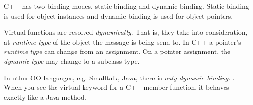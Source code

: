 



C++ has two binding modes, static-binding and dynamic binding. 
Static binding is used for object instances and dynamic binding is 
used for object pointers.

Virtual functions are resolved \textit{dynamically}. That is, they take 
into consideration, at \textit{runtime type} of the object the message is 
being send to. In C++ a pointer's \textit{runtime type} can change 
from an assignment. On a pointer assignment, the \textit{dynamic type} may change to a 
subclass type. 


In other OO languages, e.g. Smalltalk, Java, there is \textit{only dynamic binding}. 
. 
When you see the virtual keyword for a C++ member function, it behaves exactly 
like a Java method. 



\frmrule


